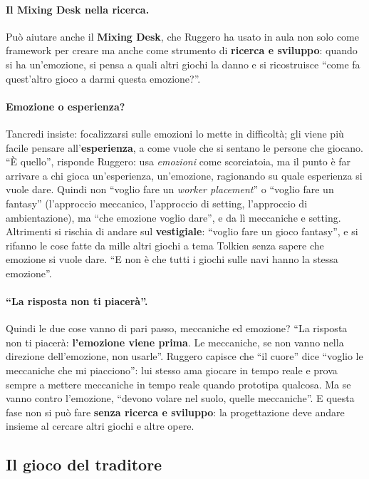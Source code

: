 \paragraph{Il Mixing Desk nella ricerca.} Può aiutare anche il \textbf{Mixing Desk},
che Ruggero ha usato in aula non solo come framework per creare ma anche come strumento
di \textbf{ricerca e sviluppo}: quando si ha un'emozione, si pensa a quali altri giochi
la danno e si ricostruisce ``come fa quest'altro gioco a darmi questa emozione?''.

\paragraph{Emozione o esperienza?} Tancredi insiste: focalizzarsi sulle emozioni lo
mette in difficoltà; gli viene più facile pensare all'\textbf{esperienza}, a come
vuole che si sentano le persone che giocano. ``È quello'', risponde Ruggero: usa
\emph{emozioni} come scorciatoia, ma il punto è far arrivare a chi gioca
un'esperienza, un'emozione, ragionando su quale esperienza si vuole dare. Quindi non
``voglio fare un \emph{worker placement}'' o ``voglio fare un fantasy'' (l'approccio
meccanico, l'approccio di setting, l'approccio di ambientazione), ma ``che emozione
voglio dare'', e da lì meccaniche e setting. Altrimenti si rischia di andare sul
\textbf{vestigiale}: ``voglio fare un gioco fantasy'', e si rifanno le cose fatte da
mille altri giochi a tema Tolkien senza sapere che emozione si vuole dare. ``E non è
che tutti i giochi sulle navi hanno la stessa emozione''.

\paragraph{``La risposta non ti piacerà''.} Quindi le due cose vanno di pari passo,
meccaniche ed emozione? ``La risposta non ti piacerà: \textbf{l'emozione viene
prima}. Le meccaniche, se non vanno nella direzione dell'emozione, non usarle''.
Ruggero capisce che ``il cuore'' dice ``voglio le meccaniche che mi piacciono'': lui
stesso ama giocare in tempo reale e prova sempre a mettere meccaniche in tempo reale
quando prototipa qualcosa. Ma se vanno contro l'emozione, ``devono volare nel suolo,
quelle meccaniche''. E questa fase non si può fare \textbf{senza ricerca e sviluppo}:
la progettazione deve andare insieme al cercare altri giochi e altre opere.

\subsection{Il gioco del traditore}
\label{a7:sec:tut-traditore}

